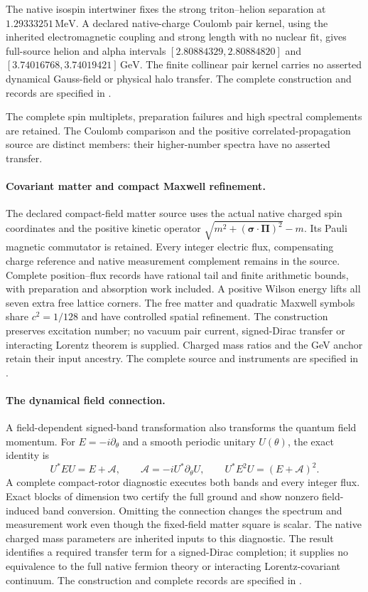The native isospin intertwiner fixes the strong triton--helion separation
at $1.29333251\,\mathrm{MeV}$. A declared native-charge Coulomb
pair kernel, using the inherited electromagnetic coupling and strong
length with no nuclear fit, gives full-source helion and alpha intervals
$[2.80884329,2.80884820]$ and $[3.74016768,3.74019421]\,\mathrm{GeV}$.
The finite collinear pair kernel carries
no asserted dynamical Gauss-field or physical halo transfer.
The complete construction and records are specified in .

The complete spin multiplets, preparation failures and high spectral
complements are retained. The Coulomb comparison and the positive
correlated-propagation source are distinct members: their higher-number
spectra have no asserted transfer.

\paragraph{Covariant matter and compact Maxwell refinement.}
The declared compact-field matter source uses the actual native charged
spin coordinates and the positive kinetic operator
$\sqrt{m^2+(\boldsymbol\sigma\cdot\boldsymbol\Pi)^2}-m$.
Its Pauli magnetic commutator is retained. Every integer electric flux,
compensating charge reference and native measurement complement remains in
the source. Complete position--flux records have rational tail and finite
arithmetic bounds, with preparation and absorption work included.
A positive Wilson energy lifts all seven extra free lattice corners.
The free matter and quadratic Maxwell symbols share $c^2=1/128$ and have
controlled spatial refinement. The construction preserves excitation number;
no vacuum pair current, signed-Dirac transfer or interacting Lorentz theorem
is supplied. Charged mass ratios and the GeV anchor retain their input ancestry.
The complete source and instruments are specified in .

\paragraph{The dynamical field connection.}
A field-dependent signed-band transformation also transforms the quantum
field momentum. For $E=-i\partial_\theta$ and a smooth periodic unitary
$U(\theta)$, the exact identity is
\[
 U^* E U=E+\mathcal A,\qquad
 \mathcal A=-iU^*\partial_\theta U,\qquad
 U^* E^2U=(E+\mathcal A)^2.
\]
A complete compact-rotor diagnostic executes both bands and every integer
flux. Exact blocks of dimension two certify the full ground and show
nonzero field-induced band conversion. Omitting the connection changes the
spectrum and measurement work even though the fixed-field matter square is
scalar. The native charged mass parameters are inherited inputs to this
diagnostic. The result identifies a required transfer term for a signed-Dirac
completion; it supplies no equivalence to the full native fermion theory or
interacting Lorentz-covariant continuum.
The construction and complete records are specified in .

